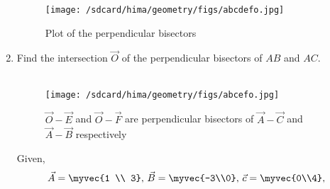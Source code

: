 \documentclass[11pt]{book}
\begin{document}
\begin{enumerate}[label=\thesection.\arabic*.,ref=\thesection.\theenumi]
\begin{figure}[H]
\centering
\texttt{[image: /sdcard/hima/geometry/figs/abcdefo.jpg]}
\caption{Plot of the perpendicular bisectors}
\label{fig:figure1}
\end{figure}


\item Find the intersection $\vec{O}$ of the perpendicular bisectors of $AB$ and $AC$.
 \\
\solution \\
\begin{figure}[H]
\centering
\texttt{[image: /sdcard/hima/geometry/figs/abcefo.jpg]}
\caption{$\vec{O}-\vec{E}$ and $\vec{O}-\vec{F}$ are perpendicular bisectors of $\vec{A}-\vec{C}$ and $\vec{A}-\vec{B}$ respectively}
\label{fig:Figure_2}
\end{figure}

Given,
\begin{align}
\vec{A}=\myvec{1 \\ 3},\,
\vec{B}=\myvec{-3\\0},\,
	\vec{c}=\myvec{0\\4},\,
\end{align}


\end{enumerate}
\end{document}
